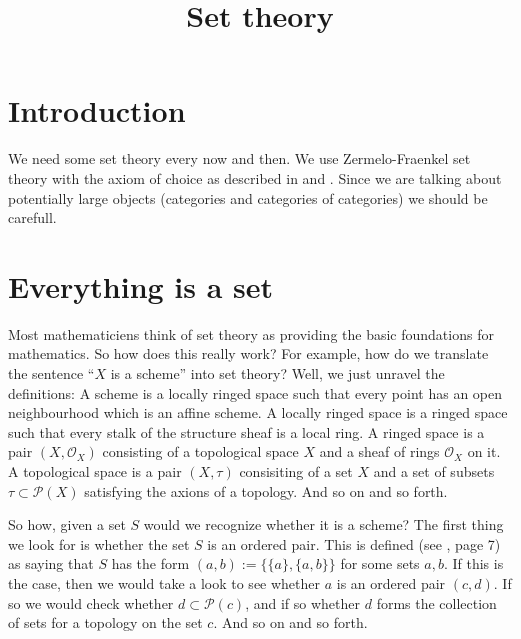 

%


\title{Set theory}


\maketitle

\tableofcontents

\section{Introduction}
\label{section-introduction}

\noindent
We need some set theory every now and then. We use Zermelo-Fraenkel set theory
with the axiom of choice as described in \cite{Kunen} and \cite{Jech}. Since
we are talking about potentially large objects (categories and categories of
categories) we should be carefull.

\section{Everything is a set}
\label{section-sets-everything}

\noindent
Most mathematiciens think of set theory as providing the basic
foundations for mathematics. So how does this really work?
For example, how do we translate the sentence
``$X$ is a scheme'' into set theory? Well, we just unravel the
definitions: A scheme is a locally ringed space such that every
point has an open neighbourhood which is an affine scheme. 
A locally ringed space is a ringed space such that every stalk
of the structure sheaf is a local ring. A ringed space is
a pair $(X, \mathcal{O}_X)$ consisting of a topological space
$X$ and a sheaf of rings $\mathcal{O}_X$ on it. A topological
space is a pair $(X, \tau)$ consisiting of a set
$X$ and a set of subsets $\tau \subset \mathcal{P}(X)$ 
satisfying the axions of a topology. And so on and
so forth.

\medskip\noindent
So how, given a set $S$ would we recognize whether it is a scheme?
The first thing we look for is whether the set $S$ is an ordered pair.
This is defined (see \cite{Jech}, page 7) as saying that $S$
has the form $(a,b) := \{\{a\},\{a,b\}\}$ for some sets $a, b$. If this is
the case, then we would take a look to see whether $a$ is an
ordered pair $(c,d)$. If so we would check whether 
$d \subset \mathcal{P}(c)$, and if so whether $d$ forms the collection
of sets for a topology on the set $c$. And so on and so forth.

